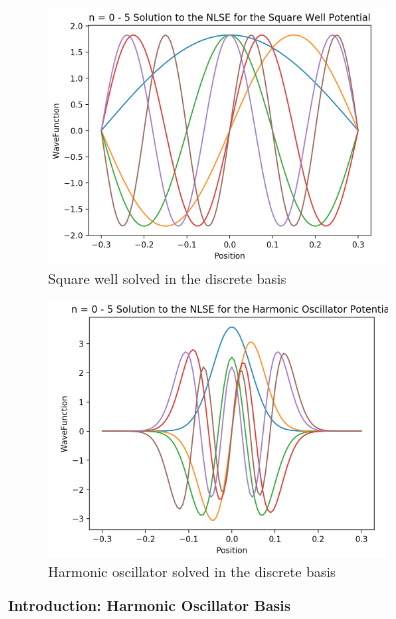 \documentclass[%
 reprint,
 amsmath,amssymb,
 aps,
]{revtex4-1}
\begin{document}
\begin{figure}
\includegraphics[width=9cm]{DiscreteBasisSquareWell}
\caption{Square well solved in the discrete basis}
\end{figure}
\begin{figure}
\includegraphics[width=9cm]{DiscreteBasisHarmonicOscillator}
\caption{Harmonic oscillator solved in the discrete basis}
\end{figure}

\noindent \textbf{Introduction: Harmonic Oscillator Basis}\\
\end{document}
